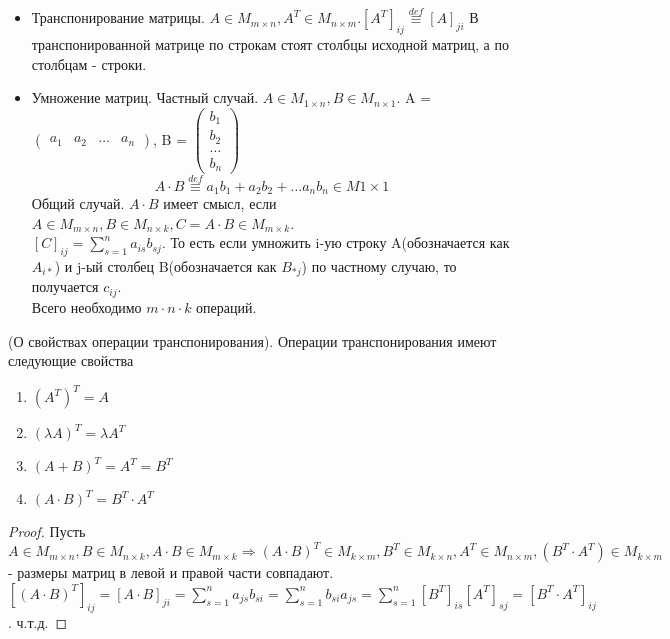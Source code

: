 \begin{itemize}
\begin{definition}
		\end{definition}
		\item Транспонирование матрицы. \(A\in M_{m\times n}, A^T\in M_{n\times m}. [A^T]_{ij}\overset{def}{\equiv} [A]_{ji}\)
		В транспонированной матрице по строкам стоят столбцы исходной матриц, а по столбцам - строки.
		\item Умножение матриц. Частный случай. \(A\in M_{1\times n}, B \in M_{n\times 1}\).
		A = \(\begin{pmatrix}
			a_1 & a_2 & \ldots & a_n
		\end{pmatrix}\), B = \(\begin{pmatrix}
			b_1 \\ b_2 \\ \ldots \\ b_n
		\end{pmatrix}\)
		\[A\cdot B \overset{def}{\equiv} a_1b_1 + a_2b_2 + \ldots a_nb_n \in M{1\times 1}\]
		Общий случай. \(A\cdot B\) имеет смысл, если \(A\in M_{m\times n}, B \in M_{n\times k}, C = A\cdot B\in M_{m\times k} \). \\
		\([C]_{ij} = \sum_{s = 1}^{n} a_{is}b_{sj}\). То есть если умножить i-ую строку A(обозначается как \(A_{i*}\)) и j-ый столбец B(обозначается как \(B_{*j}\)) по частному случаю, то получается \(c_{ij}\).\\ Всего необходимо \(m\cdot n\cdot k\) операций.
	\end{itemize}
	\begin{proposition}
		(О свойствах операции транспонирования). Операции транспонирования имеют следующие свойства 
		\begin{enumerate}
			\item \((A^T)^T = A\) 
			\item \((\lambda A)^T = \lambda A^T\)
			\item \((A+B)^T = A^T = B^T\)
			\item \((A\cdot B)^T = B^T\cdot A^T\)
		\end{enumerate}
	\end{proposition}
	\begin{proof}
		Пусть \(A\in M_{m\times n}, B\in M_{n\times k}, A\cdot B \in M_{m\times k} \Longrightarrow (A\cdot B)^T\in M_{k\times m}, B^T\in M_{k\times n}, A^T\in M_{n\times m}, (B^T\cdot A ^T)\in M_{k\times m}\) - размеры матриц в левой и правой части совпадают. \\
		\([(A\cdot B)^T]_{ij} = [A\cdot B]_{ji} = \sum_{s = 1}^{n}a_{js}b_{si} = \sum_{s=1}^{n}b_{si}a_{js} = \sum_{s=1}^{n}[B^T]_{is}[A^T]_{sj} = [B^T\cdot A^T]_{ij}\). ч.т.д.
	\end{proof}
